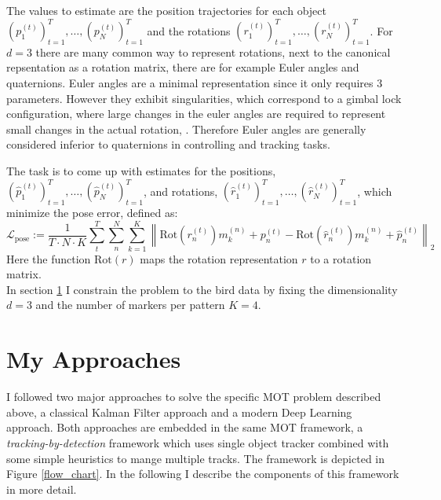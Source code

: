 \documentclass{article}
\begin{document}
The values to estimate are the position trajectories for each object $\left(p^{(t)}_1\right)_{t=1}^T, \dots,\left(p^{(t)}_N\right)_{t=1}^T$ and the rotations $\left(r^{(t)}_1\right)_{t=1}^T, \dots,\left(r^{(t)}_N\right)_{t=1}^T$. 
For $d=3$ there are many common way to represent rotations, next to the canonical repsentation as a rotation matrix, there are for example Euler angles and quaternions. Euler angles are a minimal representation since it only requires 3 parameters. However they exhibit singularities, which correspond to a gimbal lock configuration, where large changes in the euler angles are required to represent small changes in the actual rotation, \cite{manifolds}. Therefore Euler angles are generally considered inferior to quaternions in controlling and tracking tasks. 

The task is to come up with estimates for the positions, $\left(\hat{p}^{(t)}_1\right)_{t=1}^T, \dots,\left(\hat{p}^{(t)}_N\right)_{t=1}^T$, and rotations, $\left(\hat{r}^{(t)}_1\right)_{t=1}^T, \dots,\left(\hat{r}^{(t)}_N\right)_{t=1}^T$, which minimize the pose error, defined as:
\begin{equation}
	\mathcal{L}_{\text{pose}} := \frac{1}{T\cdot N \cdot K}\sum_{t}^{T}\sum_{n}^{N} \sum_{k=1}^{K} \left\| \text{Rot}(r^{(t)}_n)m^{(n)}_k + p^{(t)}_n - \text{Rot}(\hat{r}^{(t)}_n)m^{(n)}_k + \hat{p}^{(t)}_n \right\|_2
\end{equation}
Here the function $\text{Rot}(r)$ maps the rotation representation $r$ to a rotation matrix. %
\\

In section \ref{approaches} I constrain the problem to the bird data by fixing the dimensionality $d=3$ and the number of markers per pattern $K=4$.


\section{My Approaches}
\label{approaches}
I followed two major approaches to solve the specific MOT problem described above, a classical Kalman Filter approach and a modern Deep Learning approach. Both approaches are embedded in the same MOT framework, a \emph{tracking-by-detection} framework which uses single object tracker combined with some simple heuristics to mange multiple tracks. The framework is depicted in Figure \ref{flow_chart}. In the following I describe the components of this framework in more detail.
\end{document}
